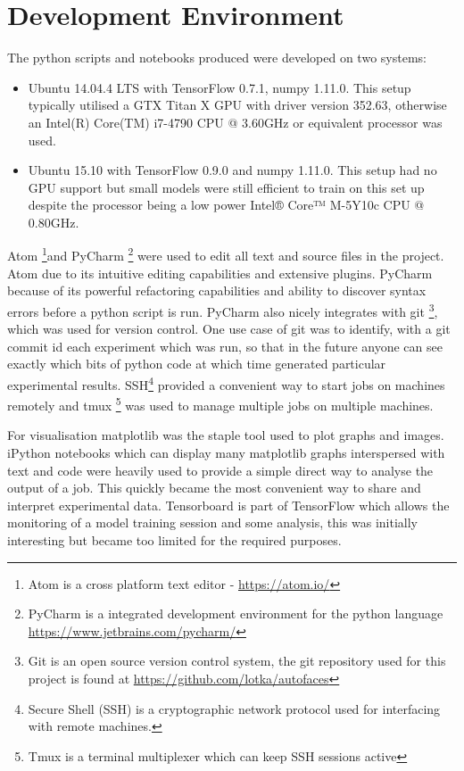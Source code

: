   \section{Development Environment}
    The python scripts and notebooks produced were developed on two systems:
    \begin{itemize}
      \item     Ubuntu 14.04.4 LTS with TensorFlow 0.7.1, numpy 1.11.0. This setup typically utilised a GTX Titan X GPU with driver version 352.63, otherwise
                an Intel(R) Core(TM) i7-4790 CPU @ 3.60GHz or equivalent processor was used.
      \item     Ubuntu 15.10 with TensorFlow 0.9.0 and numpy 1.11.0. This setup had no GPU support but small models were still efficient to train on this set up
                despite the processor being a low power Intel® Core™ M-5Y10c CPU @ 0.80GHz.
    \end{itemize}
    Atom \footnote{Atom is a cross platform text editor - \url{https://atom.io/}}and PyCharm \footnote{PyCharm is a integrated development environment for the python language \url{https://www.jetbrains.com/pycharm/}} were used to edit all text and source files in the project.
    Atom due to its intuitive editing capabilities and extensive plugins. PyCharm because
    of its powerful refactoring capabilities and ability to discover syntax errors before
    a python script is run. PyCharm also nicely integrates with git \footnote{Git is an open source version control system,
    the git repository used for this project is found at \url{https://github.com/lotka/autofaces}}, which was used for version control.
    One use case of git was to identify, with a git commit id each experiment which was run, so that in the future
    anyone can see exactly which bits of python code at which time generated particular experimental results.
    SSH\footnote{Secure Shell (SSH) is a cryptographic network protocol used for interfacing with remote machines.} provided a convenient way to start jobs on machines remotely and tmux \footnote{Tmux is a terminal
    multiplexer which can keep SSH sessions active} was used to manage multiple jobs on multiple machines.

    For visualisation matplotlib was the staple tool used to plot graphs and images. iPython notebooks
    which can display many matplotlib graphs interspersed with text and code were heavily used to
    provide a simple direct way to analyse the output of a job. This quickly became the most convenient way to
    share and interpret experimental data. Tensorboard is part of TensorFlow which allows the monitoring of a
    model training session and some analysis, this was initially interesting but became too limited for the required purposes.
